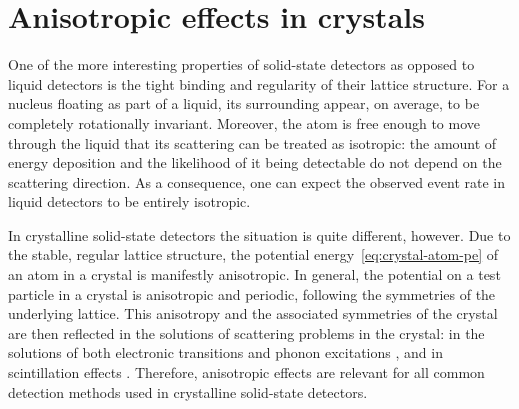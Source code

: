 \documentclass[b5paper, 10pt, twoside]{book}
\begin{document}
\section{Anisotropic effects in crystals}

One of the more interesting properties of solid-state detectors as opposed to liquid detectors is the tight binding and regularity of their lattice structure. For a nucleus floating as part of a liquid, its surrounding appear, on average, to be completely rotationally invariant. Moreover, the atom is free enough to move through the liquid that its scattering can be treated as isotropic: the amount of energy deposition and the likelihood of it being detectable do not depend on the scattering direction. As a consequence, one can expect the observed event rate in liquid detectors to be entirely isotropic.

In crystalline solid-state detectors the situation is quite different, however. Due to the stable, regular lattice structure, the potential energy~\eqref{eq:crystal-atom-pe} of an atom in a crystal is manifestly anisotropic. In general, the potential on a test particle in a crystal is anisotropic and periodic, following the symmetries of the underlying lattice. This anisotropy and the associated symmetries of the crystal are then reflected in the solutions of scattering problems in the crystal: in the solutions of both electronic transitions and phonon excitations \parencite{TrickleEtAl2020}, and in scintillation effects \parencite{SekiyaEtAl2003}. Therefore, anisotropic effects are relevant for all common detection methods used in crystalline solid-state detectors.
\end{document}
